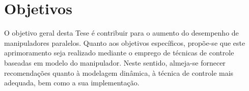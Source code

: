 \documentclass[]{politex}
\begin{document}

\section{Objetivos}\label{objetivos}

O objetivo geral desta Tese é contribuir para o aumento do desempenho de manipuladores paralelos. Quanto aos objetivos específicos, propõe-se que este aprimoramento seja realizado mediante o emprego de técnicas de controle baseadas em modelo do manipulador. Neste sentido, almeja-se fornecer recomendações quanto à modelagem dinâmica, à técnica de controle mais adequada, bem como a sua implementação.




\end{document}
